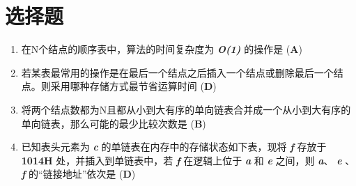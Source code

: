 \section{选择题}
\begin{enumerate}
    \item 在N个结点的顺序表中，算法的时间复杂度为 \textbf{\textit{O(1)}} 的操作是 (\textbf{A})
    \item 若某表最常⽤的操作是在最后⼀个结点之后插⼊⼀个结点或删除最后⼀个结点。则采⽤哪种存储⽅式最节省运算时间 (\textbf{D})
    \newpage
    \item 将两个结点数都为N且都从⼩到⼤有序的单向链表合并成⼀个从⼩到⼤有序的单向链表，那么可能的最少⽐较次数是 (\textbf{B})
    \item 已知表头元素为 \textbf{\textit{c}} 的单链表在内存中的存储状态如下表，现将 \textbf{\textit{f}} 存放于 \textbf{1014H} 处，并插⼊到单链表中，若 \textbf{\textit{f}} 在逻辑上位于 \textbf{\textit{a}} 和 \textbf{\textit{e}} 之间，则 \textbf{\textit{a}}、 \textbf{\textit{e}} 、\textbf{\textit{f}} 的“链接地址”依次是 (\textbf{D})
\end{enumerate}
